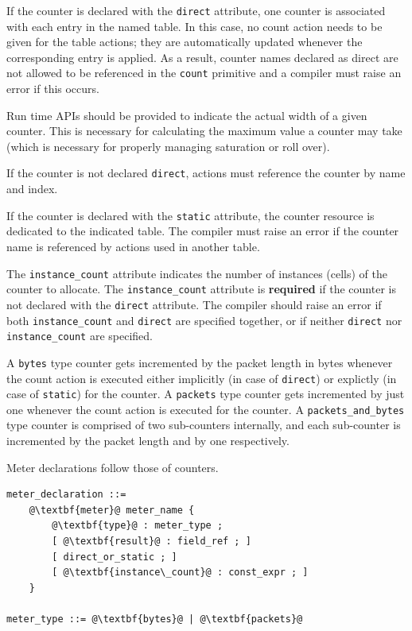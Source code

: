 \documentclass[12pt]{article}
\begin{document}
If the counter is declared with the \texttt{direct} attribute, one
counter is associated with each entry in the named table. In this
case, no count action needs to be given for the table actions; they
are automatically updated whenever the corresponding entry is
applied. As a result, counter names declared as direct are not allowed
to be referenced in the \texttt{count} primitive and a compiler must
raise an error if this occurs.

Run time APIs should be provided to indicate the actual width of a
given counter.  This is necessary for calculating the maximum value a
counter may take (which is necessary for properly managing saturation
or roll over).

If the counter is not declared \texttt{direct}, actions must reference
the counter by name and index.

If the counter is declared with the \texttt{static} attribute, the
counter resource is dedicated to the indicated table. The compiler
must raise an error if the counter name is referenced by actions used
in another table.

The \texttt{instance_count} attribute indicates the number of
instances (cells) of the counter to allocate. The
\texttt{instance_count} attribute is \textbf{required} if the counter
is not declared with the \texttt{direct} attribute.  The compiler
should raise an error if both \texttt{instance_count} and
\texttt{direct} are specified together, or if neither \texttt{direct}
nor \texttt{instance_count} are specified.  

{\color{red}
A \texttt{bytes} type counter gets incremented by the packet length in bytes 
whenever the count action is executed either implicitly (in case of 
\texttt{direct}) or explictly (in case of \texttt{static}) for the counter. 
A \texttt{packets} type counter gets incremented by just one whenever 
the count action is executed for the counter. 
A \texttt{packets_and_bytes} type counter is comprised of two sub-counters 
internally, and each sub-counter is incremented by the packet length and 
by one respectively.
}


Meter declarations follow those of counters.

\begin{lstlisting}[frame=single,backgroundcolor=\color{bnfgreen},escapechar=\@]
meter_declaration ::= 
    @\textbf{meter}@ meter_name {
        @\textbf{type}@ : meter_type ;
        [ @\textbf{result}@ : field_ref ; ]
        [ direct_or_static ; ]
        [ @\textbf{instance\_count}@ : const_expr ; ]
    }

meter_type ::= @\textbf{bytes}@ | @\textbf{packets}@
\end{lstlisting}
\end{document}
